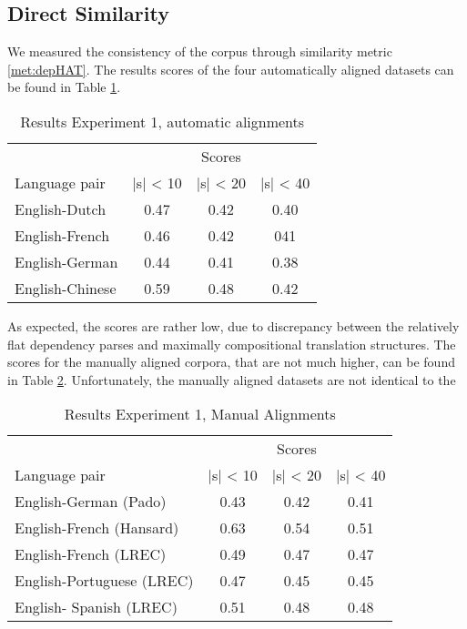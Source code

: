 \documentclass{report}
\begin{document}
\subsection{Direct Similarity}

We measured the consistency of the corpus through similarity metric \ref{met:depHAT}. The results scores of the four automatically aligned datasets can be found in Table \ref{tab:scores1}.

\begin{table}[!h]
\centering
\begin{tabular}{l|ccc}
& \multicolumn{3}{c}{Scores}\\
Language pair & |s| < 10 & |s| < 20 & |s| < 40\\
\hline
English-Dutch & 0.47 & 0.42 & 0.40 \\
English-French & 0.46 & 0.42 & 041 \\
English-German & 0.44 & 0.41 & 0.38 \\
English-Chinese & 0.59 & 0.48 & 0.42\\
\end{tabular}
\caption{Results Experiment 1, automatic alignments}\label{tab:scores1}
\end{table}

As expected, the scores are rather low, due to discrepancy between the relatively flat dependency parses and maximally compositional translation structures. The scores for the manually aligned corpora, that are not much higher, can be found in Table \ref{tab:scores2}. Unfortunately, the manually aligned datasets are not identical to the 

\begin{table}[!h]
\centering
\begin{tabular}{l|ccc}
& \multicolumn{3}{c}{Scores}\\
Language pair & |s| < 10 & |s| < 20 & |s| < 40\\
\hline
English-German (Pado) & 0.43 & 0.42 & 0.41 \\
English-French (Hansard) & 0.63 & 0.54 & 0.51 \\
English-French (LREC) & 0.49 & 0.47 & 0.47 \\
English-Portuguese (LREC) & 0.47 & 0.45 & 0.45 \\
English- Spanish (LREC) & 0.51 & 0.48 & 0.48\\
\end{tabular}
\caption{Results Experiment 1, Manual Alignments}\label{tab:scores2}
\end{table}
\end{document}
